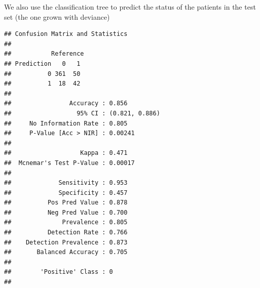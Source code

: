 \documentclass[ignorenonframetext,]{beamer}
\newenvironment{Shaded}{\begin{snugshade}}{\end{snugshade}}
\newcommand{\KeywordTok}[1]{\textcolor[rgb]{0.13,0.29,0.53}{\textbf{#1}}}
\newcommand{\DataTypeTok}[1]{\textcolor[rgb]{0.13,0.29,0.53}{#1}}
\newcommand{\StringTok}[1]{\textcolor[rgb]{0.31,0.60,0.02}{#1}}
\newcommand{\OperatorTok}[1]{\textcolor[rgb]{0.81,0.36,0.00}{\textbf{#1}}}
\newcommand{\NormalTok}[1]{#1}
\begin{document}
\begin{frame}[fragile]

We also use the classification tree to predict the status of the
patients in the test set (the one grown with deviance)

\footnotesize

\begin{Shaded}
\end{Shaded}

\begin{verbatim}
## Confusion Matrix and Statistics
## 
##           Reference
## Prediction   0   1
##          0 361  50
##          1  18  42
##                                         
##                Accuracy : 0.856         
##                  95% CI : (0.821, 0.886)
##     No Information Rate : 0.805         
##     P-Value [Acc > NIR] : 0.00241       
##                                         
##                   Kappa : 0.471         
##  Mcnemar's Test P-Value : 0.00017       
##                                         
##             Sensitivity : 0.953         
##             Specificity : 0.457         
##          Pos Pred Value : 0.878         
##          Neg Pred Value : 0.700         
##              Prevalence : 0.805         
##          Detection Rate : 0.766         
##    Detection Prevalence : 0.873         
##       Balanced Accuracy : 0.705         
##                                         
##        'Positive' Class : 0             
## 
\end{verbatim}

\normalsize

\end{frame}
\end{document}

